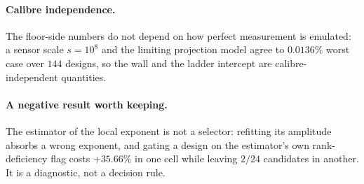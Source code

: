 \paragraph{Calibre independence.} The floor-side numbers do not depend on how
perfect measurement is emulated: a sensor scale $s=10^8$ and the limiting
projection model agree to $0.0136\%$ worst case over $144$ designs, so the wall
and the ladder intercept are calibre-independent quantities.

\paragraph{A negative result worth keeping.} The estimator of the local exponent
is not a selector: refitting its amplitude absorbs a wrong exponent, and gating a
design on the estimator's own rank-deficiency flag costs $+35.66\%$ in one cell
while leaving $2/24$ candidates in another. It is a diagnostic, not a decision
rule.

